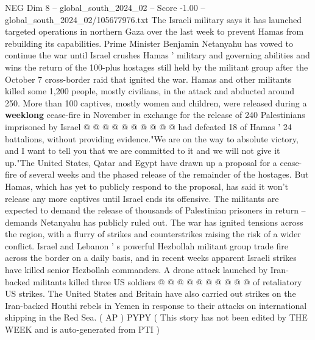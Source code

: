 \begin{textsample}{NEG Dim 8 – global\_south\_2024\_02 – Score -1.00 – global\_south\_2024\_02/105677976.txt}
The Israeli military says it has launched targeted operations in northern Gaza over the last week to prevent Hamas from rebuilding its capabilities.
Prime Minister Benjamin Netanyahu has vowed to continue the war until Israel crushes Hamas ' military and governing abilities and wins the return of the 100-plus hostages still held by the militant group after the October 7 cross-border raid that ignited the war.
Hamas and other militants killed some 1,200 people, mostly civilians, in the attack and abducted around 250.
More than 100 captives, mostly women and children, were released during a \textbf{weeklong} cease-fire in November in exchange for the release of 240 Palestinians imprisoned by Israel @ @ @ @ @ @ @ @ @ @ had defeated 18 of Hamas ' 24 battalions, without providing evidence."We are on the way to absolute victory, and I want to tell you that we are committed to it and we will not give it up."The United States, Qatar and Egypt have drawn up a proposal for a cease-fire of several weeks and the phased release of the remainder of the hostages.
But Hamas, which has yet to publicly respond to the proposal, has said it won't release any more captives until Israel ends its offensive.
The militants are expected to demand the release of thousands of Palestinian prisoners in return -- demands Netanyahu has publicly ruled out.
The war has ignited tensions across the region, with a flurry of strikes and counterstrikes raising the risk of a wider conflict.
Israel and Lebanon ' s powerful Hezbollah militant group trade fire across the border on a daily basis, and in recent weeks apparent Israeli strikes have killed senior Hezbollah commanders.
A drone attack launched by Iran-backed militants killed three US soldiers @ @ @ @ @ @ @ @ @ @ of retaliatory US strikes.
The United States and Britain have also carried out strikes on the Iran-backed Houthi rebels in Yemen in response to their attacks on international shipping in the Red Sea. ( AP ) PYPY ( This story has not been edited by THE WEEK and is auto-generated from PTI )

\end{textsample}
